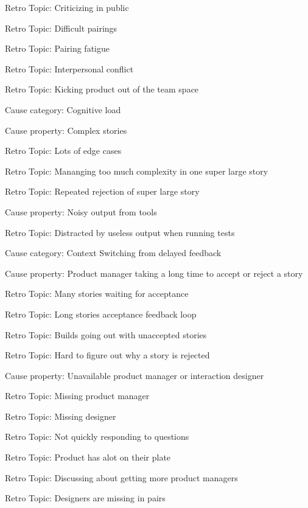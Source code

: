 \quad \quad \quad Retro Topic: Criticizing in public

\quad \quad \quad Retro Topic: Difficult pairings

\quad \quad \quad Retro Topic: Pairing fatigue

\quad \quad \quad Retro Topic: Interpersonal conflict

\quad \quad \quad Retro Topic: Kicking product out of the team space

\quad Cause category: Cognitive load

\quad \quad Cause property: Complex stories

\quad \quad \quad Retro Topic: Lots of edge cases

\quad \quad \quad Retro Topic: Mananging too much complexity in one super large story

\quad \quad \quad Retro Topic: Repeated rejection of super large story

\quad \quad Cause property: Noisy output from tools

\quad \quad \quad Retro Topic: Distracted by useless output when running tests

\quad Cause category: Context Switching from delayed feedback

\quad \quad Cause property: Product manager taking a long time to accept or reject a story

\quad \quad \quad Retro Topic: Many stories waiting for acceptance

\quad \quad \quad Retro Topic: Long stories acceptance feedback loop

\quad \quad \quad Retro Topic: Builds going out with unaccepted stories

\quad \quad \quad Retro Topic: Hard to figure out why a story is rejected

\quad \quad Cause property: Unavailable product manager or interaction designer

\quad \quad \quad Retro Topic: Missing product manager

\quad \quad \quad Retro Topic: Missing designer

\quad \quad \quad Retro Topic: Not quickly responding to questions

\quad \quad \quad Retro Topic: Product has alot on their plate

\quad \quad \quad Retro Topic: Discussing about getting more product managers

\quad \quad \quad Retro Topic: Designers are missing in pairs

